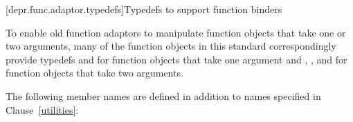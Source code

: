 [depr.func.adaptor.typedefs]{Typedefs to support function binders}

\pnum
To enable old function adaptors to manipulate function objects
that take one or two arguments,
many of the function objects in this standard
correspondingly provide typedefs
 and 
for function objects that take one argument and
, , and 
for function objects that take two arguments.

\pnum
The following member names are defined in addition to names specified in Clause~\ref{utilities}:

%
%
%
%
